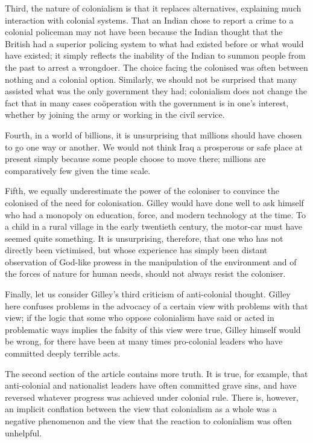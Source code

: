 \begin{multicols}{2}
Third, the nature of colonialism is that it replaces alternatives, explaining much interaction with colonial systems. That an Indian chose to report a crime to a colonial policeman may not have been because the Indian thought that the British had a superior policing system to what had existed before or what would have existed; it simply reflects the inability of the Indian to summon people from the past to arrest a wrongdoer. The choice facing the colonised was often between nothing and a colonial option. Similarly, we should not be surprised that many assisted what was the only government they had; colonialism does not change the fact that in many cases coöperation with the government is in one's interest, whether by joining the army or working in the civil service.

Fourth, in a world of billions, it is unsurprising that millions should have chosen to go one way or another. We would not think Iraq a prosperous or safe place at present simply because some people choose to move there; millions are comparatively few given the time scale.

Fifth, we equally underestimate the power of the coloniser to convince the colonised of the need for colonisation. Gilley would have done well to ask himself who had a monopoly on education, force, and modern technology at the time. To a child in a rural village in the early twentieth century, the motor-car must have seemed quite something. It is unsurprising, therefore, that one who has not directly been victimised, but whose experience has simply been distant observation of God-like prowess in the manipulation of the environment and of the forces of nature for human needs, should not always resist the coloniser. 

Finally, let us consider Gilley's third criticism of anti-colonial thought. Gilley here confuses problems in the advocacy of a certain view with problems with that view; if the logic that some who oppose colonialism have said or acted in problematic ways implies the falsity of this view were true, Gilley himself would be wrong, for there have been at many times pro-colonial leaders who have committed deeply terrible acts.

The second section of the article contains more truth. It is true, for example, that anti-colonial and nationalist leaders have often committed grave sins, and have reversed whatever progress was achieved under colonial rule. There is, however, an implicit conflation between the view that colonialism as a whole was a negative phenomenon and the view that the reaction to colonialism was often unhelpful.


\end{multicols}
